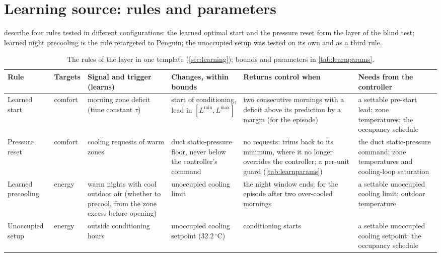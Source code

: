 \section{Learning source: rules and parameters}\label{app:learning}
 describe four rules tested in different configurations: the learned optimal start and the
pressure reset form the layer of the blind test; learned night precooling is the rule retargeted to Penguin; the unoccupied
setup was tested on its own and as a third rule.
\begin{table}[!htbp]
\centering
\caption{The rules of the layer in one template (\cref{sec:learning}); bounds and parameters in \cref{tab:learnparams}.}
\label{tab:rules}
\footnotesize
\setlength{\tabcolsep}{4pt}
\begin{tabular}{>{\raggedright\arraybackslash}p{1.6cm}>{\raggedright\arraybackslash}p{1.1cm}>{\raggedright\arraybackslash}p{2.3cm}>{\raggedright\arraybackslash}p{2.3cm}>{\raggedright\arraybackslash}p{2.4cm}>{\raggedright\arraybackslash}p{2.5cm}}
\toprule
Rule & Targets & Signal and trigger (learns) & Changes, within bounds & Returns control when & Needs from the controller\\
\midrule
Learned start & comfort & morning zone deficit (time constant $\tau$) & start of conditioning, lead in $[L^{\min}, L^{\max}]$ & two consecutive mornings with a deficit above its prediction by a margin (for the episode) & a settable pre-start lead; zone temperatures; the occupancy schedule\\
Pressure reset & comfort & cooling requests of warm zones & duct static-pressure floor, never below the controller's command & no requests: trims back to its minimum, where it no longer overrides the controller; a per-unit guard (\cref{tab:learnparams}) & the duct static-pressure command; zone temperatures and cooling-loop saturation\\
Learned precooling & energy & warm nights with cool outdoor air (whether to precool, from the zone excess before opening) & unoccupied cooling limit & the night window ends; for the episode after two over-cooled mornings & a settable unoccupied cooling limit; outdoor temperature\\
Unoccupied setup & energy & outside conditioning hours & unoccupied cooling setpoint (32.2\,$^\circ$C) & conditioning starts & a settable unoccupied cooling setpoint; the occupancy schedule\\
\bottomrule
\end{tabular}
\end{table}

